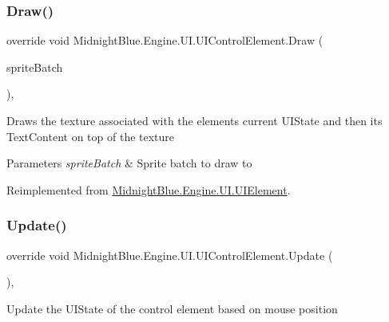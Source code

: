 \subsubsection{\texorpdfstring{Draw()}{Draw()}}
{\footnotesize\ttfamily override void Midnight\+Blue.\+Engine.\+U\+I.\+U\+I\+Control\+Element.\+Draw (\begin{DoxyParamCaption}\item[{Sprite\+Batch}]{sprite\+Batch }\end{DoxyParamCaption})\hspace{0.3cm}{\ttfamily [inline]}, {\ttfamily [virtual]}}



Draws the texture associated with the elements current U\+I\+State and then its Text\+Content on top of the texture 


\begin{DoxyParams}{Parameters}
{\em sprite\+Batch} & Sprite batch to draw to\\
\hline
\end{DoxyParams}


Reimplemented from \hyperlink{class_midnight_blue_1_1_engine_1_1_u_i_1_1_u_i_element_a0faa27f642478cd428c4718f66263325}{Midnight\+Blue.\+Engine.\+U\+I.\+U\+I\+Element}.

\hypertarget{class_midnight_blue_1_1_engine_1_1_u_i_1_1_u_i_control_element_a646726d45236a7b770493f987a8ef1d2}{}\label{class_midnight_blue_1_1_engine_1_1_u_i_1_1_u_i_control_element_a646726d45236a7b770493f987a8ef1d2} 
\subsubsection{\texorpdfstring{Update()}{Update()}}
{\footnotesize\ttfamily override void Midnight\+Blue.\+Engine.\+U\+I.\+U\+I\+Control\+Element.\+Update (\begin{DoxyParamCaption}{ }\end{DoxyParamCaption})\hspace{0.3cm}{\ttfamily [inline]}, {\ttfamily [virtual]}}



Update the U\+I\+State of the control element based on mouse position 



